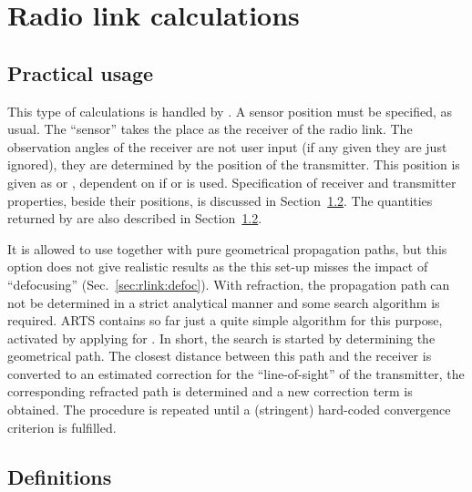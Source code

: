 \section{Radio link calculations}
\label{sec:rlinks}

\subsection{Practical usage}
%
This type of calculations is handled by . A sensor
position must be specified, as usual. The ``sensor'' takes the place as the
receiver of the radio link. The observation angles of the receiver are not user
input (if any given they are just ignored), they are determined by the position
of the transmitter. This position is given as  or
, dependent on if  or 
is used. Specification of receiver and transmitter properties, beside their
positions, is discussed in Section~\ref{sec:rlinks:oview}. The quantities
returned by  are also described in
Section~\ref{sec:rlinks:oview}.

It is allowed to use  together with pure geometrical
propagation paths, but this option does not give realistic results as the this
set-up misses the impact of ``defocusing'' (Sec.~\ref{sec:rlink:defoc}). With
refraction, the propagation path can not be determined in a strict analytical
manner and some search algorithm is required. ARTS contains so far just a quite
simple algorithm for this purpose, activated by applying
 for . In short, the search
is started by determining the geometrical path. The closest distance between
this path and the receiver is converted to an estimated correction for the
``line-of-sight'' of the transmitter, the corresponding refracted path is
determined and a new correction term is obtained. The procedure is repeated
until a (stringent) hard-coded convergence criterion is fulfilled.

   
\subsection{Definitions}
\label{sec:rlinks:oview}

